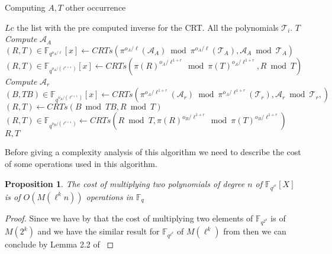 \documentclass{lms}
\newtheorem{prop}[thm]{Proposition}
\begin{document}
\begin{algorithm}
\caption{\label{computingT2ir}Computing $A,T$ other occurrence}
\begin{algorithmic}[5]
\REQUIRE $Lc$ the list with the pre computed inverse for the CRT. All the polynomials $\mathcal{T}_i$.
\ENSURE $T$
\STATE \textit{Compute} $\mathcal{A}_A$ %
\STATE $\left( R,T \right) \in \mathbb{F}_{q^{o_A/\ell}}[x] \gets CRTs \left( \pi^{o_A/\ell}(\mathcal{A}_A) \bmod  \pi^{o_A/\ell}(\mathcal{T}_A),\mathcal{A}_A \bmod \mathcal{T}_A \right)$
\STATE $\left( R , T \right) \in \mathbb{F}_{q^{o_A/(\ell^{r+1})}}[x] \gets CRTs \left( \pi(R)^{o_A/\ell^{1+r}} \bmod \pi(T)^{o_A/\ell^{1+r}}, R \bmod T \right) $
\STATE \textit{Compute} $\mathcal{A}_r$%
\STATE $\left( B,TB \right)\in \mathbb{F}_{q^{o_A/(\ell^{r+1})}}[x]  \gets CRTs \left( \pi^{o_A/\ell^{1+r}}(\mathcal{A}_r) \bmod \pi^{o_A/\ell^{1+r}} (\mathcal{T}_r),\mathcal{A}_r \bmod \mathcal{T}_r, \right)$
\STATE $\left( R,T \right) \gets CRTs \left(B \bmod TB, R \bmod T \right) $
\ENDFOR
{}%
\STATE $\left( R , T \right)\in \mathbb{F}_{q^{o_B/(\ell^{r+1})}} \gets CRTs \left( R \bmod T ,\pi(R)^{o_B/\ell^{1+r}} \bmod \pi(T)^{o_B/\ell^{1+r}} \right)$
\ENDFOR
\RETURN $R,T$
\end{algorithmic}
\end{algorithm}

Before giving a complexity analysis of this algorithm we need to describe the cost of some operations used in this algorithm.

\begin{prop}
The cost of multiplying two polynomials of degree $n$ of $\mathbb{F}_{q^{\ell^k}}[X] $ is of $O(M(\ell^kn))$ operations in $\mathbb{F}_q$
\end{prop}

\begin{proof}
Since we have by \cite{DoSc12}  that the cost of multiplying two elements of $\mathbb{F}_{q^{2^k}}$ is of $M(2^k)$ and we have the similar result for $\mathbb{F}_{q^{\ell^k}}$ of $M(\ell^k)$ from \cite{DeDoSc13} then we can conclude by Lemma 2.2 of \cite{vzgathen+shoup92}
\end{proof}
\end{document}
